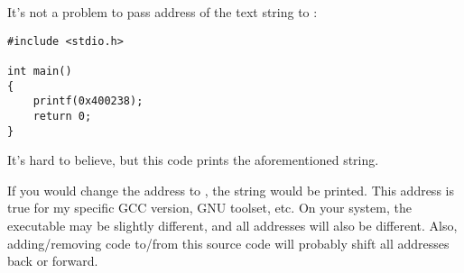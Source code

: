 It's not a problem to pass address of the text string  to :

\begin{lstlisting}[style=customc]
#include <stdio.h>

int main()
{
    printf(0x400238);
    return 0;
}
\end{lstlisting}

It's hard to believe, but this code prints the aforementioned string.

If you would change the address to , the  string would be printed.
This address is true for my specific GCC version, GNU toolset, etc.
On your system, the executable may be slightly different, and all addresses will also be different.
Also, adding/removing code to/from this source code will probably shift all addresses back or forward.
